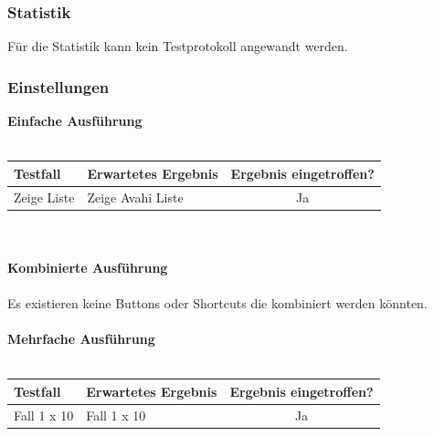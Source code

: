 \subsubsection{Statistik}
Für die Statistik kann kein Testprotokoll angewandt werden.
\subsubsection{Einstellungen}
\textbf{Einfache Ausführung}\ \\ \\
\begin{tabular}[c]{|p{6cm}|p{6cm}|c|}
\hline
\textbf{Testfall} & \textbf{Erwartetes Ergebnis} & \textbf{Ergebnis eingetroffen?}\\
\hline
Zeige Liste & Zeige Avahi Liste & Ja\\
\hline
\end{tabular}
\ \\ \\
\textbf{Kombinierte Ausführung}\ \\ \\
Es existieren keine Buttons oder Shortcuts die kombiniert werden könnten.\ \\ \\
\textbf{Mehrfache Ausführung}\ \\ \\
\begin{tabular}[c]{|p{6cm}|p{6cm}|c|}
\hline
\textbf{Testfall} & \textbf{Erwartetes Ergebnis} & \textbf{Ergebnis eingetroffen?}\\
\hline
Fall 1 x 10 & Fall 1 x 10 & Ja\\
\hline
\end{tabular}
